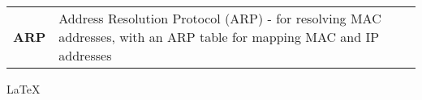 
\def\arraystretch{1.5}
\begin{table}[H]
    \centering
    \begin{tabular}{ p{4cm}  p{12cm} } 
        \textbf{ARP} & Address Resolution Protocol (ARP) - for resolving MAC addresses, with an ARP table for mapping MAC and IP addresses \\ 
    \end{tabular}
\end{table}

\LaTeX